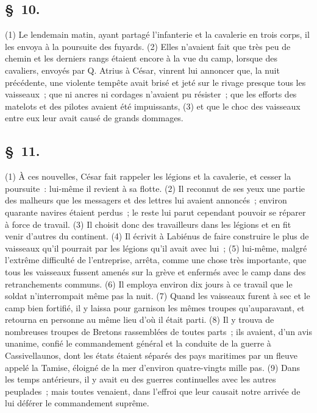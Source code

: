 \documentclass[french,twoside]{book} %
\begin{document}
\subsection[{§ 10.}]{ \textsc{§ 10.} }
\noindent (1) Le lendemain matin, ayant partagé l’infanterie et la cavalerie en trois corps, il les envoya à la poursuite des fuyards. (2) Elles n’avaient fait que très peu de chemin et les derniers rangs étaient encore à la vue du camp, lorsque des cavaliers, envoyés par Q. Atrius à César, vinrent lui annoncer que, la nuit précédente, une violente tempête avait brisé et jeté sur le rivage presque tous les vaisseaux ; que ni ancres ni cordages n’avaient pu résister ; que les efforts des matelots et des pilotes avaient été impuissants, (3) et que le choc des vaisseaux entre eux leur avait causé de grands dommages.
\subsection[{§ 11.}]{ \textsc{§ 11.} }
\noindent (1) À ces nouvelles, César fait rappeler les légions et la cavalerie, et cesser la poursuite : lui-même il revient à sa flotte. (2) Il reconnut de ses yeux une partie des malheurs que les messagers et des lettres lui avaient annoncés ; environ quarante navires étaient perdus ; le reste lui parut cependant pouvoir se réparer à force de travail. (3) Il choisit donc des travailleurs dans les légions et en fit venir d’autres du continent. (4) Il écrivit à Labiénus de faire construire le plus de vaisseaux qu’il pourrait par les légions qu’il avait avec lui ; (5) lui-même, malgré l’extrême difficulté de l’entreprise, arrêta, comme une chose très importante, que tous les vaisseaux fussent amenés sur la grève et enfermés avec le camp dans des retranchements communs. (6) Il employa environ dix jours à ce travail que le soldat n’interrompait même pas la nuit. (7) Quand les vaisseaux furent à sec et le camp bien fortifié, il y laissa pour garnison les mêmes troupes qu’auparavant, et retourna en personne au même lieu d’où il était parti. (8) Il y trouva de nombreuses troupes de Bretons rassemblées de toutes parts ; ils avaient, d’un avis unanime, confié le commandement général et la conduite de la guerre à Cassivellaunos, dont les états étaient séparés des pays maritimes par un fleuve appelé la Tamise, éloigné de la mer d’environ quatre-vingts mille pas. (9) Dans les temps antérieurs, il y avait eu des guerres continuelles avec les autres peuplades ; mais toutes venaient, dans l’effroi que leur causait notre arrivée de lui déférer le commandement suprême.
\end{document}
